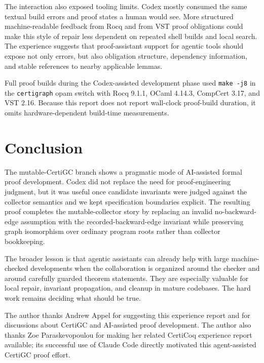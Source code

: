 \documentclass[acmsmall,nonacm]{acmart}
\newcommand{\Rocq}{Rocq}
\newcommand{\CertiGC}{CertiGC}
\newcommand{\VST}{VST}
\begin{document}
The interaction also exposed tooling limits.  Codex mostly consumed the same
textual build errors and proof states a human would see.  More structured
machine-readable feedback from \Rocq{} and from \VST{} proof obligations could
make this style of repair less dependent on repeated shell builds and local
search.  The experience suggests that proof-assistant support for agentic tools
should expose not only errors, but also obligation structure, dependency
information, and stable references to nearby applicable lemmas.

Full proof builds during the Codex-assisted development phase used
\texttt{make -j8} in the \texttt{certigraph} opam switch with \Rocq{} 9.1.1, OCaml 4.14.3,
CompCert 3.17, and \VST{} 2.16.  Because this report does not report wall-clock
proof-build duration, it omits hardware-dependent build-time measurements.

\section{Conclusion}

The mutable-\CertiGC{} branch shows a pragmatic mode of AI-assisted formal proof
development.  Codex did not replace the need for proof-engineering judgment, but
it was useful once candidate invariants were judged against the collector
semantics and we kept specification boundaries explicit.  The
resulting proof completes the mutable-collector story by replacing an invalid
no-backward-edge assumption with the recorded-backward-edge invariant while
preserving graph isomorphism over ordinary program roots rather than collector
bookkeeping.

The broader lesson is that agentic assistants can already help with large
machine-checked developments when the collaboration is organized around the
checker and around carefully guarded theorem statements.  They are especially
valuable for local repair, invariant propagation, and cleanup in mature
codebases.  The hard work remains deciding what should be true.

\begin{acks}
The author thanks Andrew Appel for suggesting this experience report and for
discussions about \CertiGC{} and AI-assisted proof development.  The author also
thanks Zoe Paraskevopoulou for making her related CertiCoq experience report
available; its successful use of Claude Code directly motivated this
agent-assisted \CertiGC{} proof effort.
\end{acks}



\end{document}

